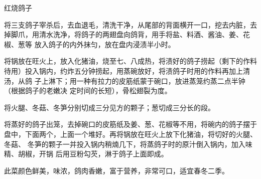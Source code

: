 \begin{recipe}{红烧鸽子}

\ingredients


\preparation

\step 将三支鸽子宰杀后，去血退毛，清洗干净，从尾部的背面横开一口，挖去内脏，去
掉脚爪，用清水洗净，将鸽子的两翅盘向鸽背，用手将盐、料酒、酱油、姜、花椒、葱等
放入鸽子的内外抹匀，放在盘内浸渍半小时。

\step 将锅放在旺火上，放入化猪油，烧至七、八成热，将渍好的鸽子捞起（剩下的作料
待用）投入锅内，约炸五分钟捞起，用蒸碗放好，将渍鸽子时用的作料再加上清汤，从鸽
子上淋下；用一种有拉力的皮筋纸蒙于碗口，放进蒸笼约蒸二点半钟（根据鸽子的老嫩决
定时间的长短），骨松翅裂为度。

\step 将火腿、冬菇、冬笋分别切成三分见方的颗子；葱切成三分长的段。

\step 将蒸好的鸽子出笼，去掉碗口的皮筋纸及姜、葱、花椒等不用，将碗内的鸽子摆于
盘中，下面两个，上面一个堆好。再将锅放在旺火上放下化猪油，将切好的火腿、冬菇、
冬笋的颗子一并投入锅内稍煵几下，将蒸鸽子时的原汁倒入锅内，加入味精、胡椒，开锅
后用豆粉勾芡，淋于鸽子上面即成。

\features

此菜颜色鲜美，味浓，鸽肉香嫩，富于营养，非常可口，适宜春冬二季。

\end{recipe}

